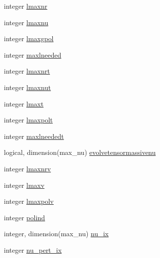 \begin{DoxyCompactItemize}
\item 
integer \mbox{\hyperlink{structgaugeinterface_1_1evolutionvars_a8dc048bf467dcafe9115fcdbd7fd7270}{lmaxnr}}
\item 
integer \mbox{\hyperlink{structgaugeinterface_1_1evolutionvars_a84aaaa265f64051e5d98e1963c6563cc}{lmaxnu}}
\item 
integer \mbox{\hyperlink{structgaugeinterface_1_1evolutionvars_a6e01b8f774a1a49d1030a09605b1bf6f}{lmaxgpol}}
\item 
integer \mbox{\hyperlink{structgaugeinterface_1_1evolutionvars_a964eda3f75927350273810f2d2ebb4a3}{maxlneeded}}
\item 
integer \mbox{\hyperlink{structgaugeinterface_1_1evolutionvars_ab3d1953b5e625174d927114f71bea2b3}{lmaxnrt}}
\item 
integer \mbox{\hyperlink{structgaugeinterface_1_1evolutionvars_a173fbd65edbbd68d61c553cb21891c31}{lmaxnut}}
\item 
integer \mbox{\hyperlink{structgaugeinterface_1_1evolutionvars_acb336731f69a4bdedde4bf684c88dcc9}{lmaxt}}
\item 
integer \mbox{\hyperlink{structgaugeinterface_1_1evolutionvars_a559e6a99e56f95d88b7b31a7a5246312}{lmaxpolt}}
\item 
integer \mbox{\hyperlink{structgaugeinterface_1_1evolutionvars_a9be0d98c9d0ba78ac13f107671d06dc5}{maxlneededt}}
\item 
logical, dimension(max\+\_\+nu) \mbox{\hyperlink{structgaugeinterface_1_1evolutionvars_a2408891bf3e266b297e24e4cf1744b06}{evolvetensormassivenu}}
\item 
integer \mbox{\hyperlink{structgaugeinterface_1_1evolutionvars_a91a0e311fd0bfd53b9d766e52f51ddf9}{lmaxnrv}}
\item 
integer \mbox{\hyperlink{structgaugeinterface_1_1evolutionvars_ab7a4282a8f7c18acb5f9e79b695ec5c9}{lmaxv}}
\item 
integer \mbox{\hyperlink{structgaugeinterface_1_1evolutionvars_a63b36dac6331f6cef94abb45d1f47e93}{lmaxpolv}}
\item 
integer \mbox{\hyperlink{structgaugeinterface_1_1evolutionvars_ab03ae77da38f9df4b1bc1d201ee10175}{polind}}
\item 
integer, dimension(max\+\_\+nu) \mbox{\hyperlink{structgaugeinterface_1_1evolutionvars_a95de1c3d22f81384a2725d3cc76e665b}{nu\+\_\+ix}}
\item 
integer \mbox{\hyperlink{structgaugeinterface_1_1evolutionvars_a0b5521e8563d7f72f0ee1415126d8b6f}{nu\+\_\+pert\+\_\+ix}}
\item 

\end{DoxyCompactItemize}
